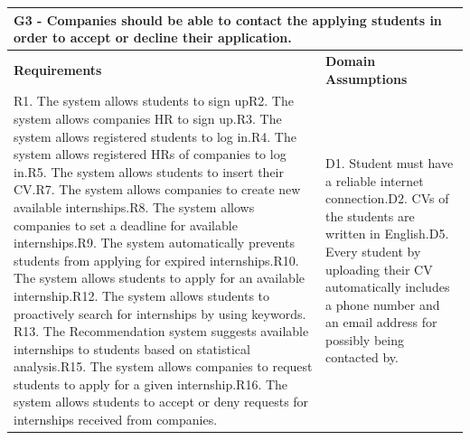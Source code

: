 \documentclass{article}
\begin{document}
\begin{table}[H]
    \centering
    \begin{tabular}{|p{}|p{}|}
        \hline
        \multicolumn{2}{|p{10cm}|}{\textbf{G3} - Companies should be able to contact the applying students in order to accept or decline their application.} \\
        \hline
        \textbf{Requirements} & \textbf{Domain Assumptions} \\
        \hline
        R1. The system allows students to sign up\newline R2. The system allows companies HR to sign up.\newline R3. The system allows registered students to log in.\newline R4. The system allows registered HRs of companies to log in.\newline R5. The system allows students to insert their CV.\newline R7. The system allows companies to create new available internships.\newline R8. The system allows companies to set a deadline for available internships.\newline R9. The system automatically prevents students from applying for expired
internships.\newline R10. The system allows students to apply for an available internship.\newline R12. The system allows students to proactively search for internships by
using keywords. \newline R13. The Recommendation system suggests available internships to students
based on statistical analysis.\newline R15. The system allows companies to request students to apply for a given
internship.\newline R16. The system allows students to accept or deny requests for internships
received from companies.\newline  & D1. Student must have a reliable internet connection.\newline D2. CVs of the students are written in English.\newline D5. Every student by uploading their CV automatically includes a phone number and an email address for possibly being contacted by. \newline
\\
        \hline
    \end{tabular}
\end{table}
\end{document}
